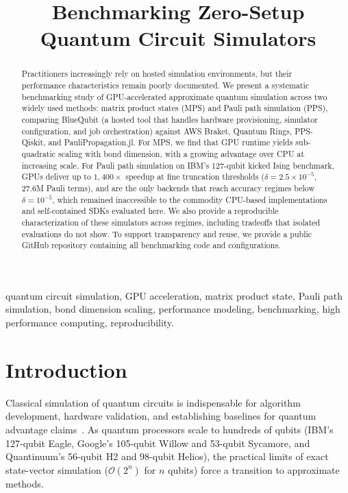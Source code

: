 \documentclass[conference,10pt]{IEEEtran}
\title{Benchmarking Zero-Setup Quantum Circuit Simulators}
\author{
\IEEEauthorblockN{Arul Rhik Mazumder\textsuperscript{1,2}, Mohammed Zuhair Mullath\textsuperscript{1}, Hayk Tepanyan\textsuperscript{1}}
\IEEEauthorblockA{
\textsuperscript{1}BlueQubit \quad
\textsuperscript{2}Carnegie Mellon University \\
\{rhik, zuhair, hayk\}@bluequbit.io \quad arulm@andrew.cmu.edu
}
}
\begin{document}
\maketitle

\begin{abstract}
Practitioners increasingly rely on hosted simulation environments, but their performance characteristics remain poorly documented. We present a systematic benchmarking study of GPU-accelerated approximate quantum simulation across two widely used methods: matrix product states (MPS) and Pauli path simulation (PPS), comparing BlueQubit (a hosted tool that handles hardware provisioning, simulator configuration, and job orchestration) against AWS Braket, Quantum Rings, PPS-Qiskit, and PauliPropagation.jl. For MPS, we find that GPU runtime yields sub-quadratic scaling with bond dimension, with a growing advantage over CPU at increasing scale. For Pauli path simulation on IBM's 127-qubit kicked Ising benchmark, GPUs deliver up to $1{,}400\times$ speedup at fine truncation thresholds ($\delta = 2.5 \times 10^{-5}$, 27.6M Pauli terms), and are the only backends that reach accuracy regimes below $\delta = 10^{-5}$, which remained inaccessible to the commodity CPU-based implementations and self-contained SDKs evaluated here. We also provide a reproducible characterization of these simulators across regimes, including tradeoffs that isolated evaluations do not show. To support transparency and reuse, we provide a public GitHub repository containing all benchmarking code and configurations.
\end{abstract}

\begin{IEEEkeywords}
    quantum circuit simulation, GPU acceleration, matrix product state, Pauli path simulation, bond dimension scaling, performance modeling, benchmarking, high performance computing, reproducibility.
\end{IEEEkeywords}

\section{Introduction}
\label{sec:intro}

Classical simulation of quantum circuits is indispensable for algorithm development, hardware validation, and establishing baselines for quantum advantage claims~\cite{preskill2018quantum}. As quantum processors scale to hundreds of qubits (IBM's 127-qubit Eagle, Google's 105-qubit Willow and 53-qubit Sycamore, and Quantinuum's 56-qubit H2 and 98-qubit Helios), the practical limits of exact state-vector simulation ($\mathcal{O}(2^{n})$ for $n$ qubits) force a transition to approximate methods.
\end{document}
